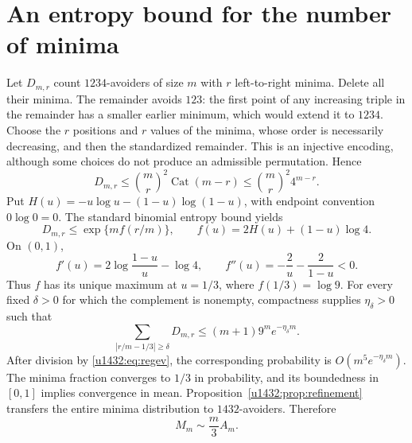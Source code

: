 \documentclass[11pt]{article}
\theoremstyle{remark}\newtheorem{remark}[theorem]{Remark}
\newcommand{\Cat}{\operatorname{Cat}}
\begin{document}
\section{An entropy bound for the number of minima}\label{u1432:sec:entropy}
Let $D_{m,r}$ count $1234$-avoiders of size $m$ with $r$ left-to-right
minima. Delete all their minima. The remainder avoids $123$: the first
point of any increasing triple in the remainder has a smaller earlier
minimum, which would extend it to $1234$. Choose the $r$ positions and
$r$ values of the minima, whose order is necessarily decreasing, and
then the standardized remainder. This is an injective encoding, although
some choices do not produce an admissible permutation. Hence
\begin{equation}\label{u1432:eq:entropybound}
 D_{m,r}\le \binom{m}{r}^{\!2}\Cat(m-r)
            \le \binom{m}{r}^{\!2}4^{m-r}.
\end{equation}
Put $H(u)=-u\log u-(1-u)\log(1-u)$, with endpoint convention
$0\log0=0$. The standard binomial entropy bound yields
\[
 D_{m,r}\le \exp\{m f(r/m)\},\qquad
 f(u)=2H(u)+(1-u)\log4.
\]
On $(0,1)$,
\[
 f'(u)=2\log\frac{1-u}{u}-\log4,
 \qquad f''(u)=-\frac2u-\frac2{1-u}<0.
\]
Thus $f$ has its unique maximum at $u=1/3$, where $f(1/3)=\log9$.
For every fixed $\delta>0$ for which the complement is nonempty,
compactness supplies $\eta_\delta>0$ such that
\[
 \sum_{|r/m-1/3|\ge\delta}D_{m,r}
 \le (m+1)9^m e^{-\eta_\delta m}.
\]
After division by \eqref{u1432:eq:regev}, the corresponding probability is
$O(m^5e^{-\eta_\delta m})$. The minima fraction converges to $1/3$ in
probability, and its boundedness in $[0,1]$ implies convergence in mean.
Proposition~\ref{u1432:prop:refinement} transfers the entire minima distribution
to $1432$-avoiders. Therefore
\begin{equation}\label{u1432:eq:minimamean}
 M_m\sim\frac m3 A_m.
\end{equation}
\end{document}
